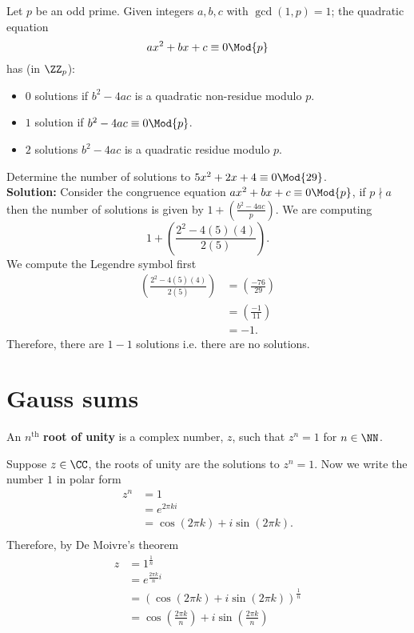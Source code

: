 \documentclass[12pt, a4paper]{article}
\begin{document}
\begin{mdthm}
    Let \(p\) be an odd prime. Given integers \(a,b,c\) with \(\gcd(1,p)=1\); the quadratic equation
    \[ax^2+bx+c \equiv 0 \Mod{p}\]
    has (in \(\ZZ_p\)):
    \begin{itemize}
        \item \(0\) solutions if \(b^2-4ac\) is a quadratic non-residue modulo \(p\).
        \item \(1\) solution if \(b^2-4ac \equiv 0 \Mod{p}\).
        \item \(2\) solutions \(b^2-4ac\) is a quadratic residue modulo \(p\).
    \end{itemize}
\end{mdthm}

\begin{mdexample}
    Determine the number of solutions to \(5x^2+2x+4 \equiv 0 \Mod{29}\). \\
    \textbf{Solution:} Consider the congruence equation \(ax^2 +bx +c \equiv 0 \Mod{p}\), if \(p \nmid a\) then the number of solutions is given by \(1+ \left( \frac{b^2-4ac}{p} \right)\). We are computing 
    \[1+\left( \frac{2^2 - 4(5)(4)}{2(5)} \right).\]
    We compute the Legendre symbol first
    \[\begin{aligned}
        \left( \frac{2^2 - 4(5)(4)}{2(5)} \right) &= \left( \frac{-76}{29} \right) \\
        &= \left( \frac{-1}{11} \right) \\
        &= -1.
    \end{aligned}\]
    Therefore, there are \(1-1\) solutions i.e. there are no solutions.
\end{mdexample}

\section{Gauss sums}

\begin{definition}
    An \(n^\text{th}\) \textbf{root of unity} is a complex number, \(z\), such that \(z^n =1\) for \(n \in \NN\).
\end{definition}

\begin{mdnote}
    Suppose \(z\in \CC\), the roots of unity are the solutions to \(z^n =1\). Now we write the number \(1\) in polar form
    \[\begin{aligned}
        z^n &=1 \\
        &= e^{2\pi k i} \\
        &=\cos(2\pi k)+i\sin(2\pi k). \\
    \end{aligned}\]
    Therefore, by De Moivre's theorem
    \[\begin{aligned}
        z &=1^{\frac{1}{n}} \\
        &= e^{\frac{2\pi k}{n} i} \\
        &= (\cos(2\pi k)+i\sin(2\pi k))^{\frac{1}{n}} \\
        &= \cos\left( \frac{2\pi k}{n} \right)+i\sin\left( \frac{2\pi k}{n} \right)
    \end{aligned}\]

\end{mdnote}
\end{document}
